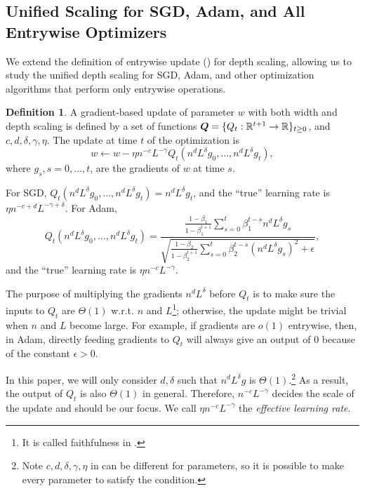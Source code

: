 \documentclass{article}
\theoremstyle{plain}
\theoremstyle{definition}
\newtheorem{definition}[theorem]{Definition}
\begin{document}
\subsection{Unified Scaling for SGD, Adam, and All Entrywise Optimizers}\label{sec:unified_scaling}

We extend the definition of entrywise update (\cite{yang2023tensor}) for depth scaling, allowing us to study the unified depth scaling for SGD, Adam, and other optimization algorithms that perform only entrywise operations. 

\begin{definition}\label{def:unified-scaling}
A gradient-based update of parameter $w$ with both width and depth scaling is defined by a set of functions $\boldsymbol{Q} = \{Q_t:\mathbb{R}^{t+1}\to\mathbb{R}\}_{t\ge0}$, and $c, d, \delta, \gamma, \eta$.
The update at time $t$ of the optimization is 
\[
w \gets w -\eta n^{-c}L^{-\gamma} Q_t(n^dL^\delta g_0, \ldots, n^dL^\delta g_t),
\]
where $g_{s},s=0,\ldots,t$, are the gradients of $w$ at time $s$.
\end{definition}

For SGD, $Q_t(n^dL^\delta g_0, \ldots, n^dL^\delta g_t)=n^dL^\delta g_t$, and the ``true'' learning rate is $\eta n^{-c+d} L^{-\gamma+\delta}$.
For Adam, \[Q_t(n^dL^\delta g_0, \ldots, n^dL^\delta g_t) = \frac{\frac{1-\beta_1 }{1-\beta_1^{t+1}}\sum_{s=0}^t \beta_1^{t-s} n^dL^\delta g_s}{ \sqrt{\frac{1-\beta_2 }{1-\beta_2^{t+1}}\sum_{s=0}^t \beta_2^{t-s} (n^dL^\delta g_s)^2 + \epsilon}},\]
and the ``true'' learning rate is $\eta n^{-c} L^{-\gamma}$. 

The purpose of multiplying the gradients $n^dL^\delta$ before $Q_t$ is to make sure the inputs to $Q_t$ are $\Theta(1)$ w.r.t. $n$ and $L$\footnote{It is called faithfulness in \citet{yang2023tensor}.}; otherwise, the update might be trivial when $n$ and $L$ become large. For example, if gradients are $o(1)$ entrywise, then, in Adam, directly feeding gradients to $Q_t$ will always give an output of $0$ because of the constant $\epsilon > 0$. 

In this paper, we will only consider $d, \delta$ such that $n^d L^\delta g$ is $\Theta(1)$.\footnote{Note $c, d, \delta, \gamma, \eta$ in  can be different for parameters, so it is possible to make every parameter to satisfy the condition.} As a result, the output of $Q_t$ is also $\Theta(1)$ in general. Therefore, $n^{-c}L^{-\gamma}$ decides the scale of the update and should be our focus. We call $\eta n^{-c}L^{-\gamma}$ the \emph{effective learning rate}. 
\end{document}

